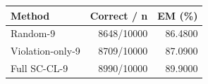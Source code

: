\begin{tabular}{lrr}
\toprule
Method & Correct / n & EM (\%) \\
\midrule
Random-9 & 8648/10000 & 86.4800 \\
Violation-only-9 & 8709/10000 & 87.0900 \\
Full SC-CL-9 & 8990/10000 & 89.9000 \\
\bottomrule
\end{tabular}
